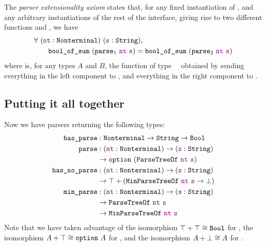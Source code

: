     The \emph{parser extensionality axiom} states that, for any fixed instantiation of , and any arbitrary instantiations of the rest of the interface, giving rise to two different functions  and , we have
    \begin{align*}
      & \forall~(\oftype{\farg{nt}}{\Nonterminal})~(\oftype{\farg{s}}{\String}), \\
      & \qquad\fname{bool\_of\_sum}~(\fname{parse$_1$}~\farg{nt}~\farg{s}) = \fname{bool\_of\_sum}~(\fname{parse$_2$}~\farg{nt}~\farg{s})
    \end{align*}
    where  is, for any types $A$ and $B$, the function of type ~\typeto~\Bool\space obtained by sending everything in the left component to \true, and everything in the right component to \false.

  \subsection{Putting it all together}
    Now we have parsers returning the following types:
    \begin{align*}
      \fname{has\_parse} & \oftypesep \Nonterminal\typeto\String\typeto\Bool \\
      \fname{parse} & \oftypesep (\oftype{\farg{nt}}{\Nonterminal}) \typeto (\oftype{\farg{s}}{\String}) \\
      & \typeto \typeoptionp{\indname{ParseTreeOf}~\farg{nt}~\farg{s}} \\
      \fname{has\_no\_parse} & \oftypesep (\oftype{\farg{nt}}{\Nonterminal}) \typeto (\oftype{\farg{s}}{\String}) \\
      &  \typeto \typesum{\Unit}{\left(\indname{MinParseTreeOf}~\farg{nt}~\farg{s} \typeto \False\right)} \\
      \fname{min\_parse} & \oftypesep (\oftype{\farg{nt}}{\Nonterminal}) \typeto (\oftype{\farg{s}}{\String}) \\
      & \typeto \indname{ParseTreeOf}~\farg{nt}~\farg{s} \\
      & \typeto\indname{MinParseTreeOf}~\farg{nt}~\farg{s}
    \end{align*}
    Note that we have taken advantage of the isomorphism $\typesum{\Unit}{\Unit} \cong \Bool$ for , the isomorphism $\typesum{A}{\Unit} \cong \typeoption[~]{A}$ for , and the isomorphism $\typesum{A}{\False} \cong A$ for .


